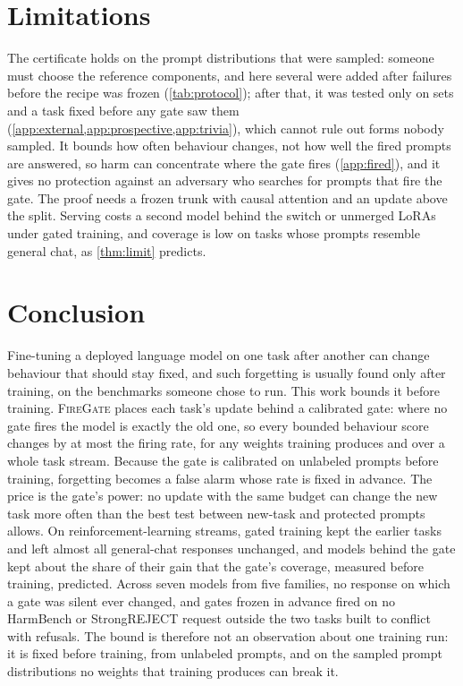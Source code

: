 \documentclass{article}
\theoremstyle{plain}
\theoremstyle{definition}
\theoremstyle{remark}
\newcommand{\method}{\textsc{FireGate}}
\begin{document}
\section{Limitations}
\label{sec:limitations}

The certificate holds on the prompt distributions that were sampled: someone must choose the reference components,
and here several were added after failures before the recipe was frozen (\cref{tab:protocol}); after that, it was tested only on sets and a task fixed before any gate saw them (\cref{app:external,app:prospective,app:trivia}), which cannot rule out forms nobody sampled. It bounds how
often behaviour changes, not how well the fired prompts are answered, so harm can concentrate where the gate fires (\cref{app:fired}), and it gives no protection against an adversary
who searches for prompts that fire the gate. The proof needs a frozen trunk with causal attention and an update above
the split. Serving costs a second model behind the switch or unmerged LoRAs under gated training, and coverage is low
on tasks whose prompts resemble general chat, as \cref{thm:limit} predicts.

\section{Conclusion}
\label{sec:conclusion}

Fine-tuning a deployed language model on one task after another can change behaviour that should stay fixed, and
such forgetting is usually found only after training, on the benchmarks someone chose to run. This work bounds it before
training. \method{} places each task's update behind a calibrated gate: where no gate fires the model is exactly the
old one, so every bounded behaviour score changes by at most the firing rate, for any weights training produces and
over a whole task stream. Because the gate is calibrated on unlabeled prompts before training, forgetting becomes a
false alarm whose rate is fixed in advance. The price is the gate's power: no update with the same budget can change
the new task more often than the best test between new-task and protected prompts allows. On reinforcement-learning
streams, gated training kept the earlier tasks and left almost all general-chat responses unchanged, and models
behind the gate kept about the share of their gain that the gate's coverage, measured before training, predicted.
Across seven models from five families, no response on which a gate was silent ever changed, and gates frozen in
advance fired on no HarmBench or StrongREJECT request outside the two tasks built to conflict with refusals. The bound
is therefore not an observation about one training run: it is fixed before training, from unlabeled prompts, and on
the sampled prompt distributions no weights that training produces can break it.
\end{document}
